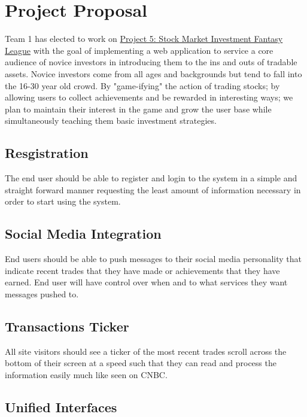 \documentclass[11pt,letterpaper,oneside]{memoir}
\begin{document}
\chapter{Project Proposal}
\label{proposal}
Team 1 has elected to work on \href{http://ece.rutgers.edu/~marsic/books/SE/projects/}
{Project 5: Stock Market Investment Fantasy League} with the goal of implementing a
web application to service a core audience of novice investors in introducing them to
the ins and outs of tradable assets.  Novice investors come from all ages and backgrounds
but tend to fall into the 16-30 year old crowd.  By "game-ifying" the action of trading
stocks; by allowing users to collect achievements and be rewarded in interesting ways; we
plan to maintain their interest in the game and grow the user base while simultaneously
teaching them basic investment strategies.

\section{Resgistration}

The end user should be able to register and login to the system in a simple and straight forward
manner requesting the least amount of information necessary in order to start using the system.

\section{Social Media Integration}

End users should be able to push messages to their social media personality that indicate
recent trades that they have made or achievements that they have earned.  End
user will have control over when and to what services they want messages pushed
to.

\section{Transactions Ticker}

All site visitors should see a ticker of the most recent trades scroll across the
bottom of their screen at a speed such that they can read and process the
information easily much like seen on CNBC.

\section{Unified Interfaces}
\end{document}
